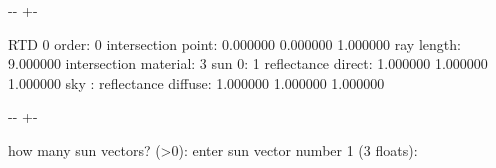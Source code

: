 \documentclass[letterpaper,10pt,english]{sphinxmanual}
\newlength\nbsphinxcodecellspacing
\begin{document}
{

\kern-\sphinxverbatimsmallskipamount\kern-\baselineskip
\kern+\FrameHeightAdjust\kern-\fboxrule
\vspace{\nbsphinxcodecellspacing}

\begin{sphinxVerbatim}[commandchars=\\\{\}]
RTD 0
order: 0        intersection point:     0.000000 0.000000 1.000000
                ray length:             9.000000
                intersection material:  3
                sun 0:                  1 reflectance
                direct:                 1.000000 1.000000 1.000000
                sky  :                  reflectance
                diffuse:                1.000000 1.000000 1.000000
\end{sphinxVerbatim}
}

{

\kern-\sphinxverbatimsmallskipamount\kern-\baselineskip
\kern+\FrameHeightAdjust\kern-\fboxrule
\vspace{\nbsphinxcodecellspacing}

\begin{sphinxVerbatim}[commandchars=\\\{\}]
how many sun vectors? (>0): enter sun vector number 1 (3 floats):
\end{sphinxVerbatim}
}
\end{document}
